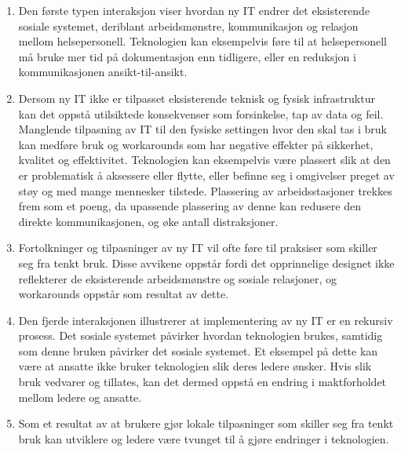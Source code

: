 \begin{enumerate}
\item Den første typen interaksjon viser hvordan ny IT endrer det eksisterende sosiale systemet, deriblant arbeidsmønstre, kommunikasjon og relasjon mellom helsepersonell. Teknologien kan eksempelvis føre til at helsepersonell må bruke mer tid på dokumentasjon enn tidligere, eller en reduksjon i kommunikasjonen ansikt-til-ansikt.
\item Dersom ny IT ikke er tilpasset eksisterende teknisk og fysisk infrastruktur kan det oppstå utilsiktede konsekvenser som forsinkelse, tap av data og feil. Manglende tilpasning av IT til den fysiske settingen hvor den skal tas i bruk kan medføre bruk og workarounds som har negative effekter på sikkerhet, kvalitet og effektivitet. Teknologien kan eksempelvis være plassert slik at den er problematisk å aksessere eller flytte, eller befinne seg i omgivelser preget av støy og med mange mennesker tilstede. Plassering av arbeidsstasjoner trekkes frem som et poeng, da upassende plassering av denne kan redusere den direkte kommunikasjonen, og øke antall distraksjoner. 
\item Fortolkninger og tilpasninger av ny IT vil ofte føre til praksiser som skiller seg fra tenkt bruk. Disse avvikene oppstår fordi det opprinnelige designet ikke reflekterer de eksisterende arbeidsmønstre og sosiale relasjoner, og workarounds oppstår som resultat av dette.
\item Den fjerde interaksjonen illustrerer at implementering av ny IT er en rekursiv prosess. Det sosiale systemet påvirker hvordan teknologien brukes, samtidig som denne bruken påvirker det sosiale systemet. Et eksempel på dette kan være at ansatte ikke bruker teknologien slik deres ledere ønsker. Hvis slik bruk vedvarer og tillates, kan det dermed oppstå en endring i maktforholdet mellom ledere og ansatte.  
\item Som et resultat av at brukere gjør lokale tilpasninger som skiller seg fra tenkt bruk kan utviklere og ledere være tvunget til å gjøre endringer i teknologien.
\end{enumerate}


